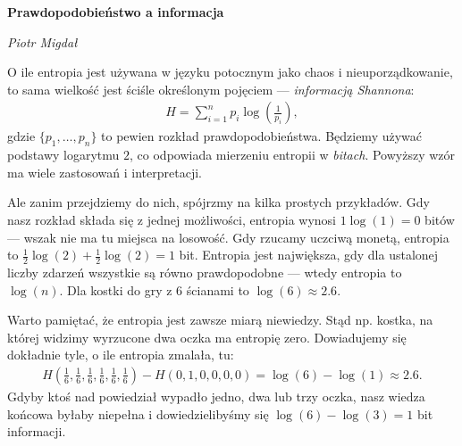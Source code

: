 \documentclass[10pt,a4paper]{article}
\begin{document}
\noindent\textbf{\LARGE Prawdopodobieństwo a informacja}

\medskip
\noindent\textit{\Large Piotr Migdał}

\medskip

O ile entropia jest używana w języku potocznym jako chaos i nieuporządkowanie, to sama wielkość jest ściśle określonym pojęciem --- \emph{informacją Shannona}:
%
%
\begin{align}
    H = \sum_{i=1}^{n} p_i \log \left(\tfrac{1}{p_i} \right),\label{eq:entropia}
\end{align}
%
%
gdzie $\{p_1, \ldots, p_n\}$ to pewien rozkład prawdopodobieństwa.
Będziemy używać podstawy logarytmu $2$, co odpowiada mierzeniu entropii w \emph{bitach}.
Powyższy wzór ma wiele zastosowań i interpretacji.

Ale zanim przejdziemy do nich, spójrzmy na kilka prostych przykładów.
Gdy nasz rozkład składa się z jednej możliwości, entropia wynosi $1 \log(1) = 0$ bitów --- wszak nie ma tu miejsca na losowość.
Gdy rzucamy uczciwą monetą, entropia to $\tfrac{1}{2} \log(2) + \tfrac{1}{2} \log(2) = 1$ bit.
Entropia jest największa, gdy dla ustalonej liczby zdarzeń wszystkie są równo prawdopodobne --- wtedy entropia to $\log(n)$.
Dla kostki do gry z $6$ ścianami to $\log(6)\approx 2.6$.

Warto pamiętać, że entropia jest zawsze miarą niewiedzy.
Stąd np. kostka, na której widzimy wyrzucone dwa oczka ma entropię zero.
Dowiadujemy się dokładnie tyle, o ile entropia zmalała, tu:
%
\begin{align}
    H(\tfrac{1}{6}, \tfrac{1}{6}, \tfrac{1}{6}, \tfrac{1}{6}, \tfrac{1}{6}, \tfrac{1}{6})
    - H(0, 1, 0, 0, 0, 0) = \log(6) - \log(1)
    \approx 2.6.
\end{align}
%
Gdyby ktoś nad powiedział wypadło jedno, dwa lub trzy oczka, nasz wiedza końcowa byłaby niepełna i dowiedzielibyśmy się $\log(6) - \log(3) = 1 $ bit informacji.


\end{document}

